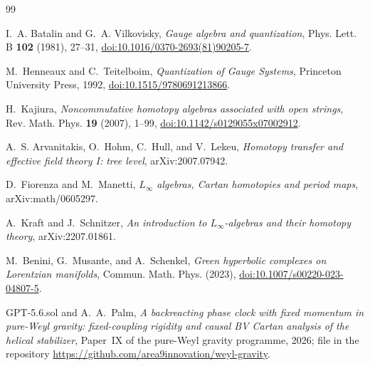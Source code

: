 \documentclass[11pt]{article}
\theoremstyle{definition}
\theoremstyle{remark}
\begin{document}
\begin{thebibliography}{99}
\raggedright

I.~A. Batalin and G.~A. Vilkovisky,
\emph{Gauge algebra and quantization},
Phys. Lett. B \textbf{102} (1981), 27--31,
\href{https://doi.org/10.1016/0370-2693(81)90205-7}{doi:10.1016/0370-2693(81)90205-7}.

M.~Henneaux and C.~Teitelboim,
\emph{Quantization of Gauge Systems},
Princeton University Press, 1992,
\href{https://doi.org/10.1515/9780691213866}{doi:10.1515/9780691213866}.

H.~Kajiura,
\emph{Noncommutative homotopy algebras associated with open strings},
Rev. Math. Phys. \textbf{19} (2007), 1--99,
\href{https://doi.org/10.1142/s0129055x07002912}{doi:10.1142/s0129055x07002912}.

A.~S. Arvanitakis, O.~Hohm, C.~Hull, and V.~Lekeu,
\emph{Homotopy transfer and effective field theory I: tree level},
arXiv:2007.07942.

D.~Fiorenza and M.~Manetti,
\emph{$L_\infty$ algebras, Cartan homotopies and period maps},
arXiv:math/0605297.

A.~Kraft and J.~Schnitzer,
\emph{An introduction to $L_\infty$-algebras and their homotopy theory},
arXiv:2207.01861.

M.~Benini, G.~Musante, and A.~Schenkel,
\emph{Green hyperbolic complexes on Lorentzian manifolds},
Commun. Math. Phys. (2023),
\href{https://doi.org/10.1007/s00220-023-04807-5}
{doi:10.1007/s00220-023-04807-5}.

GPT-5.6.sol and A.~A.~Palm,
\emph{A backreacting phase clock with fixed momentum in pure-Weyl gravity:
fixed-coupling rigidity and causal BV Cartan analysis of the helical
stabilizer},
Paper~IX of the pure-Weyl gravity programme, 2026;
file  in the
repository \url{https://github.com/area9innovation/weyl-gravity}.

\end{thebibliography}
\end{document}
